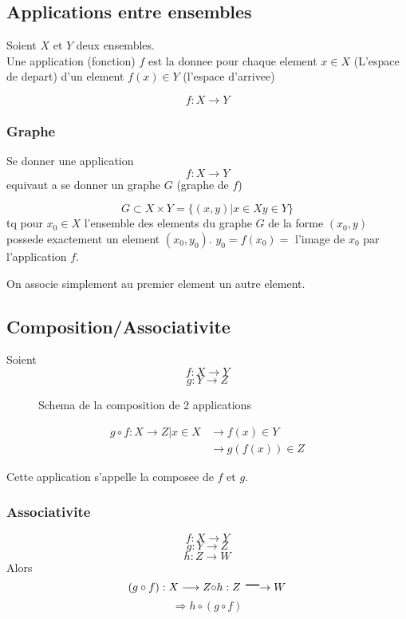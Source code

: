 \documentclass[../main.tex]{subfiles}
\begin{document}
\subsection{Applications entre ensembles}
	
Soient $X$ et $Y$ deux ensembles.\\

Une application (fonction) $f$ est la donnee pour chaque element $x \in X$ (L'espace de depart) d'un element $f(x) \in Y$ (l'espace d'arrivee)

\[ 
f: X \rightarrow Y
\]
\subsubsection{Graphe}
Se donner une application
\[ 
	f: X \rightarrow Y
\]
equivaut a se donner un graphe $G$ (graphe de $f$)

\[ 
	G \subset X \times Y = \{(x,y) \vert x \in X y \in Y\}
\]
tq pour $x_0 \in X$ l'ensemble des elements du graphe $G$ de la forme $(x_0,y)$ possede exactement un element $(x_0,y_0)$.
$y_0= f(x_0)=$ l'image de $x_0$ par l'application $f$.

On associe simplement au premier element un autre element.




\subsection{Composition/Associativite}
Soient
\[ 
f: X \rightarrow Y
\]
\[ 
g: Y \rightarrow Z
\]

\begin{figure}
    \caption{Schema de la composition de 2 applications}
    \label{fig:schemacomposition}
\end{figure}
\begin{align*}
	g \circ f : X \longrightarrow Z \vert x \in X &\longrightarrow f(x) \in Y\\
						      &\longrightarrow g(f(x)) \in Z
\end{align*}

Cette application s'appelle la composee de $f$ et $g$.

\subsubsection{Associativite}
\[ 
f:X \longrightarrow Y
\]
\[ 
g:Y \longrightarrow Z
\]
\[ 
h:Z \longrightarrow W
\]
Alors
\[ 
	( g \circ f): X \longrightarrow Z \huge{ \circ } h: Z \longrightarrow W
\]
\[ 
	\Rightarrow h \circ ( g \circ f)
\]
\end{document}
